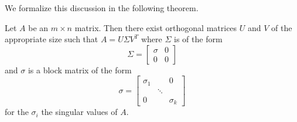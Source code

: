 \documentclass{ximera}
\begin{document}
We formalize this discussion in the following theorem.

\begin{theorem}\label{th:singvaldecomp}
Let $A$ be an $m\times n$ matrix. Then there exist
orthogonal matrices $U$ and $V$ of the appropriate size such that $A= U \Sigma V^T$ where $\Sigma$ is of the form
\[
\Sigma =
\left[
\begin{array}{cc}
\sigma & 0 \\
0 & 0
\end{array}
\right]
\]
and $\sigma $ is a block matrix of the form
\[
\sigma =\left[
\begin{array}{ccc}
\sigma _{1} &  & 0 \\
& \ddots &  \\
0 &  & \sigma _{k}
\end{array}
\right]
\]
for the $\sigma _{i}$ the singular values of $A.$
\end{theorem}
\end{document}
